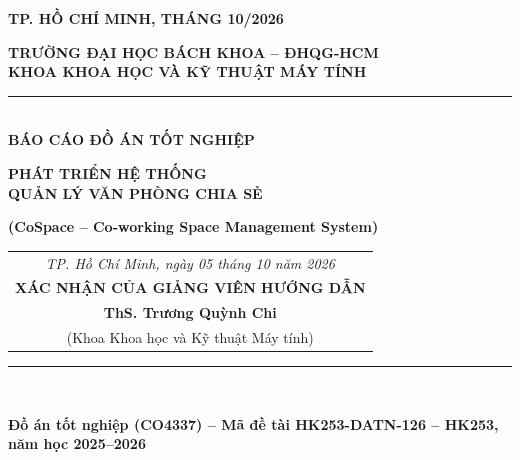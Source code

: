 \documentclass[a4paper,oneside]{report}
\newcommand{\tendetaibia}{PHÁT TRIỂN HỆ THỐNG\\ QUẢN LÝ VĂN PHÒNG CHIA SẺ}
\newcommand{\tendetaiphu}{(CoSpace -- Co-working Space Management System)}
\newcommand{\madoan}{HK253-DATN-126}
\newcommand{\thoigian}{TP. HỒ CHÍ MINH, THÁNG 10/2026}
\begin{document}
\begin{titlepage}
\vfill

\begin{center}
{\large \textbf{\thoigian}}
\end{center}
\vspace{0.4cm}
\end{titlepage}

\newpage
\thispagestyle{empty}
\begin{center}
\textbf{\large TRƯỜNG ĐẠI HỌC BÁCH KHOA -- ĐHQG-HCM} \\[0.15cm]
\textbf{\large KHOA KHOA HỌC VÀ KỸ THUẬT MÁY TÍNH} \\[0.4cm]
\rule{12cm}{0.5pt} \\[1.5cm]
\textbf{\LARGE BÁO CÁO ĐỒ ÁN TỐT NGHIỆP} \\[0.5cm]
{\LARGE\bfseries \tendetaibia\par}\vspace{0.3cm}
{\large \textbf{\tendetaiphu}} \\[2.0cm]
\end{center}

\begin{flushright}
\begin{tabular}{c}
\textit{TP. Hồ Chí Minh, ngày 05 tháng 10 năm 2026} \\[0.3cm]
\textbf{\large XÁC NHẬN CỦA GIẢNG VIÊN HƯỚNG DẪN} \\[2.5cm]
\textbf{\large ThS. Trương Quỳnh Chi} \\[0.2cm]
\small (Khoa Khoa học và Kỹ thuật Máy tính)
\end{tabular}
\end{flushright}

\vfill
\noindent \rule{\textwidth}{0.3pt} \\
{\scriptsize \textbf{Đồ án tốt nghiệp (CO4337) -- Mã đề tài \madoan{} -- HK253, năm học 2025--2026}\par}

\newpage
{}

\newpage

\newpage

% 

\begin{singlespace}
\newpage \tableofcontents
\newpage \listoffigures
\newpage \listoftables
\end{singlespace}
\end{document}
